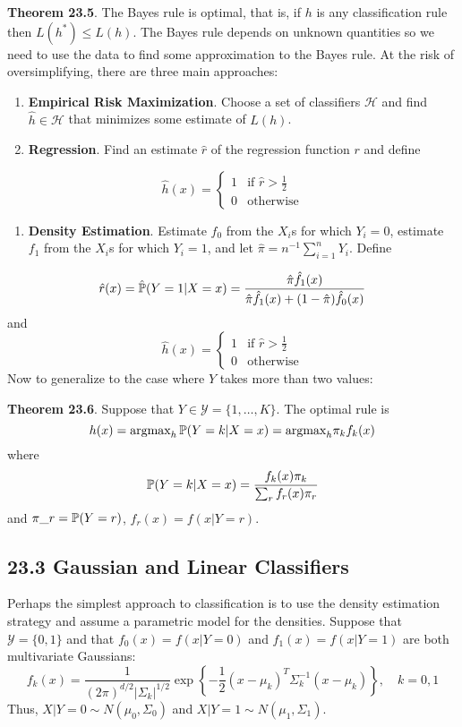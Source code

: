 \textbf{Theorem 23.5}. The Bayes rule is optimal, that is, if \(h\) is
any classification rule then \(L(h^{*}) \leq L(h)\).
The Bayes rule depends on unknown quantities so we need to use the data
to find some approximation to the Bayes rule. At the risk of
oversimplifying, there are three main approaches:
\begin{enumerate}
\def\labelenumi{\arabic{enumi}.}
\item
  \textbf{Empirical Risk Maximization}. Choose a set of classifiers
  \(\mathcal{H}\) and find \(\hat{h} \in \mathcal{H}\) that minimizes
  some estimate of \(L(h)\).
\item
  \textbf{Regression}. Find an estimate \(\hat{r}\) of the regression
  function \(r\) and define
\end{enumerate}
\[
\hat{h}(x) = \begin{cases}
1 & \text{if } \hat{r} > \frac{1}{2} \\
0 & \text{otherwise}
\end{cases}
\]
\begin{enumerate}[tightlist,label={\arabic*.},resume]
\item
  \textbf{Density Estimation}. Estimate \(f_{0}\) from the \(X_{i}\)s for
  which \(Y_{i} = 0\), estimate \(f_{1}\) from the \(X_{i}\)s for which
  \(Y_{i} = 1\), and let \(\hat{\pi} = n^{-1} \sum_{i=1}^{n} Y_{i}\). Define
\end{enumerate}
\[
\hat{r}(x) = \hat{\operatorname{\mathbb{P}}}(Y = 1 | X = x) = \frac{\hat{\pi} \hat{f}_{1}(x)}{\hat{\pi} \hat{f}_{1}(x) + (1 - \hat{\pi}) \hat{f}_{0}(x)}
\]
and
\[
\hat{h}(x) = \begin{cases}
1 & \text{if } \hat{r} > \frac{1}{2} \\
0 & \text{otherwise}
\end{cases}
\]
Now to generalize to the case where \(Y\) takes more than two values:

\textbf{Theorem 23.6}. Suppose that
\(Y \in \mathcal{Y} = \{ 1, \dots, K \}\). The optimal rule is
\[
h(x) = \text{argmax}_h \operatorname{\mathbb{P}}(Y = k | X = x) = \text{argmax}_h \pi_{k} f_{k}(x)
\]
where
\[
\operatorname{\mathbb{P}}(Y = k | X = x) = \frac{f_{k}(x) \pi_{k}}{\sum_r f_r(x) \pi_r}
\]
and $ \pi\_r = \operatorname{\mathbb{P}}(Y = r)$, \(f_r(x) = f(x | Y = r)\).

\subsection*{23.3 Gaussian and Linear Classifiers}\label{gaussian-and-linear-classifiers}
Perhaps the simplest approach to classification is to use the density
estimation strategy and assume a parametric model for the densities.
Suppose that \(\mathcal{Y} = \{ 0, 1 \}\) and that
\(f_{0}(x) = f(x | Y = 0)\) and \(f_{1}(x) = f(x | Y = 1)\) are both
multivariate Gaussians:
\[
f_{k}(x) = \frac{1}{(2\pi)^{d/2} | \Sigma_{k} |^{1/2}} \exp \left\{ -\frac{1}{2} (x - \mu_{k})^T \Sigma_{k}^{-1} (x - \mu_{k}) \right\}, \quad k = 0, 1
\]
Thus, \(X | Y = 0 \sim N(\mu_{0}, \Sigma_{0})\) and
\(X | Y = 1 \sim N(\mu_{1}, \Sigma_{1})\).

